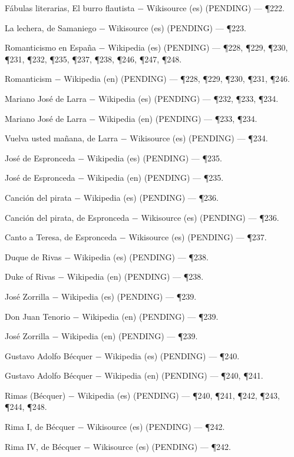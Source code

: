 \documentclass{book}
\begin{document}
\noindent Fábulas literarias, El burro flautista \(-\) Wikisource (es) (PENDING) --- \P222.

\noindent La lechera, de Samaniego \(-\) Wikisource (es) (PENDING) --- \P223.

\noindent Romanticismo en España \(-\) Wikipedia (es) (PENDING) --- \P228, \P229, \P230, \P231, \P232, \P235, \P237, \P238, \P246, \P247, \P248.

\noindent Romanticism \(-\) Wikipedia (en) (PENDING) --- \P228, \P229, \P230, \P231, \P246.

\noindent Mariano José de Larra \(-\) Wikipedia (es) (PENDING) --- \P232, \P233, \P234.

\noindent Mariano José de Larra \(-\) Wikipedia (en) (PENDING) --- \P233, \P234.

\noindent Vuelva usted mañana, de Larra \(-\) Wikisource (es) (PENDING) --- \P234.

\noindent José de Espronceda \(-\) Wikipedia (es) (PENDING) --- \P235.

\noindent José de Espronceda \(-\) Wikipedia (en) (PENDING) --- \P235.

\noindent Canción del pirata \(-\) Wikipedia (es) (PENDING) --- \P236.

\noindent Canción del pirata, de Espronceda \(-\) Wikisource (es) (PENDING) --- \P236.

\noindent Canto a Teresa, de Espronceda \(-\) Wikisource (es) (PENDING) --- \P237.

\noindent Duque de Rivas \(-\) Wikipedia (es) (PENDING) --- \P238.

\noindent Duke of Rivas \(-\) Wikipedia (en) (PENDING) --- \P238.

\noindent José Zorrilla \(-\) Wikipedia (es) (PENDING) --- \P239.

\noindent Don Juan Tenorio \(-\) Wikipedia (en) (PENDING) --- \P239.

\noindent José Zorrilla \(-\) Wikipedia (en) (PENDING) --- \P239.

\noindent Gustavo Adolfo Bécquer \(-\) Wikipedia (es) (PENDING) --- \P240.

\noindent Gustavo Adolfo Bécquer \(-\) Wikipedia (en) (PENDING) --- \P240, \P241.

\noindent Rimas (Bécquer) \(-\) Wikipedia (es) (PENDING) --- \P240, \P241, \P242, \P243, \P244, \P248.

\noindent Rima I, de Bécquer \(-\) Wikisource (es) (PENDING) --- \P242.

\noindent Rima IV, de Bécquer \(-\) Wikisource (es) (PENDING) --- \P242.
\end{document}
